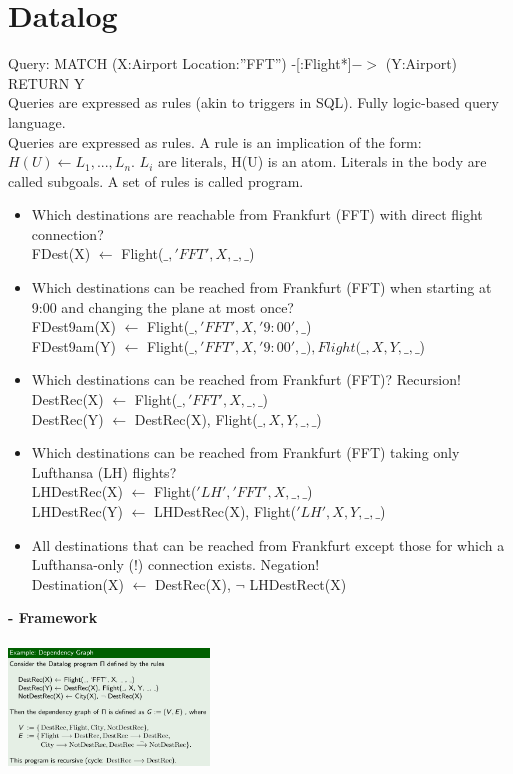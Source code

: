 \documentclass{article}
\begin{document}
\section{Datalog}
Query: MATCH (X:Airport Location:”FFT”) -[:Flight*]$->$ (Y:Airport) RETURN Y\\
Queries are expressed as rules (akin to triggers in SQL). Fully logic-based query language.\\
Queries are expressed as rules. A rule is an implication of the form: $H(U) \leftarrow L_1,...,L_n$. $L_i$ are literals, H(U) is an atom. Literals in the body are called subgoals. A set of rules is called program.\\
\begin{itemize}
\item Which destinations are reachable from Frankfurt (FFT) with direct flight connection?\\
FDest(X) $\leftarrow$ Flight($\_,'FFT',X,\_,\_$)
\item Which destinations can be reached from Frankfurt (FFT) when starting at 9:00 and changing the plane at most once?\\
FDest9am(X) $\leftarrow$ Flight($\_,'FFT',X,'9:00',\_$)\\
FDest9am(Y) $\leftarrow$ Flight($\_,'FFT',X,'9:00',\_), Flight(\_,X,Y,\_,\_$)
\item Which destinations can be reached from Frankfurt (FFT)? Recursion!\\
DestRec(X) $\leftarrow$ Flight($\_,'FFT',X,\_,\_$)\\
DestRec(Y) $\leftarrow$ DestRec(X), Flight($\_,X,Y,\_,\_$)
\item Which destinations can be reached from Frankfurt (FFT) taking only Lufthansa (LH)
flights?\\
LHDestRec(X) $\leftarrow$ Flight($'LH','FFT',X,\_,\_$)\\
LHDestRec(Y) $\leftarrow$ LHDestRec(X), Flight($'LH',X,Y,\_,\_$)
\item All destinations that can be reached from Frankfurt except those for which a
Lufthansa-only (!) connection exists. Negation!\\
Destination(X) $\leftarrow$ DestRec(X), $\neg$ LHDestRect(X)
\end{itemize}
\textbf{- Framework}\\\\
\includegraphics[width=0.4\textwidth]{77.png}\\
\end{document}
